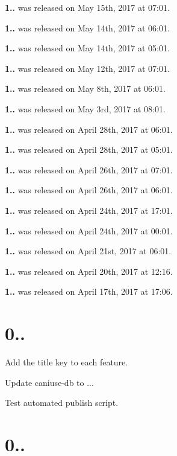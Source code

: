 \begin{DoxyItemize}
\item {\bfseries 1..} was released on May 15th, 2017 at 07\+:01.
\item {\bfseries 1..} was released on May 14th, 2017 at 06\+:01.
\item {\bfseries 1..} was released on May 14th, 2017 at 05\+:01.
\item {\bfseries 1..} was released on May 12th, 2017 at 07\+:01.
\item {\bfseries 1..} was released on May 8th, 2017 at 06\+:01.
\item {\bfseries 1..} was released on May 3rd, 2017 at 08\+:01.
\item {\bfseries 1..} was released on April 28th, 2017 at 06\+:01.
\item {\bfseries 1..} was released on April 28th, 2017 at 05\+:01.
\item {\bfseries 1..} was released on April 26th, 2017 at 07\+:01.
\item {\bfseries 1..} was released on April 26th, 2017 at 06\+:01.
\item {\bfseries 1..} was released on April 24th, 2017 at 17\+:01.
\item {\bfseries 1..} was released on April 24th, 2017 at 00\+:01.
\item {\bfseries 1..} was released on April 21st, 2017 at 06\+:01.
\item {\bfseries 1..} was released on April 20th, 2017 at 12\+:16.
\item {\bfseries 1..} was released on April 17th, 2017 at 17\+:06.
\end{DoxyItemize}

\section*{0..}


\begin{DoxyItemize}
\item Add the {\ttfamily title} key to each feature.
\item Update {\ttfamily caniuse-\/db} to {..}.
\item Test automated publish script.
\end{DoxyItemize}

\section*{0..}


